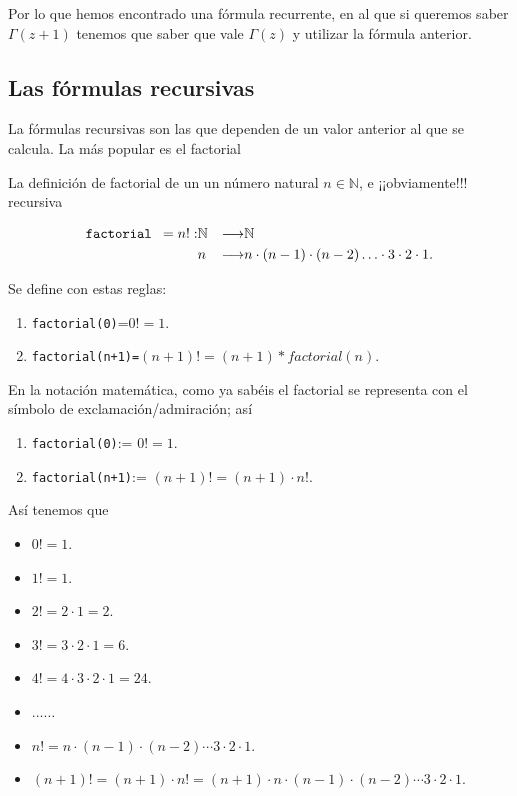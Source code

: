 \documentclass[
]{article}
\providecommand{\tightlist}{%
  \setlength{\itemsep}{0pt}\setlength{\parskip}{0pt}}
\begin{document}
Por lo que hemos encontrado una fórmula recurrente, en al que si
queremos saber \(\Gamma(z+1)\) tenemos que saber que vale \(\Gamma(z)\)
y utilizar la fórmula anterior.

\hypertarget{las-fuxf3rmulas-recursivas}{%
\subsection{Las fórmulas recursivas}\label{las-fuxf3rmulas-recursivas}}

La fórmulas recursivas son las que dependen de un valor anterior al que
se calcula. La más popular es el factorial

La definición de factorial de un un número natural \(n\in\mathbb{N}\), e
¡¡obviamente!!! recursiva

\[
\begin{align*}
\verb+factorial += n!: &\mathbb{N}& \longrightarrow  &\mathbb{N}\\
& n &\longrightarrow & n\cdot (n-1)\cdot (n-2) \ldots \cdot 3\cdot 2\cdot 1.
\end{align*}
\]

Se define con estas reglas:

\begin{enumerate}
\def\labelenumi{\arabic{enumi}.}
\tightlist
\item
  \texttt{factorial(0)}=\(0!=1\).
\item
  \texttt{factorial(n+1)=}\((n+1)!=(n+1)*factorial(n).\)
\end{enumerate}

En la notación matemática, como ya sabéis el factorial se representa con
el símbolo de exclamación/admiración; así

\begin{enumerate}
\def\labelenumi{\arabic{enumi}.}
\tightlist
\item
  \texttt{factorial(0)}:= \(0!=1\).
\item
  \texttt{factorial(n+1)}:= \((n+1)!=(n+1)\cdot n!\).
\end{enumerate}

Así tenemos que

\begin{itemize}
\tightlist
\item
  \(0!=1.\)
\item
  \(1!=1.\)
\item
  \(2!= 2\cdot 1= 2.\)
\item
  \(3!=3\cdot 2\cdot 1= 6.\)
\item
  \(4!=4\cdot 3\cdot 2\cdot 1 =24.\)
\item
  \(\ldots \ldots\)
\item
  \(n!= n\cdot (n-1) \cdot (n-2) \cdots 3\cdot 2\cdot 1.\)
\item
  \((n+1)!= (n+1)\cdot n!= (n+1)\cdot n\cdot (n-1) \cdot (n-2) \cdots 3\cdot 2\cdot 1.\)
\end{itemize}
\end{document}
